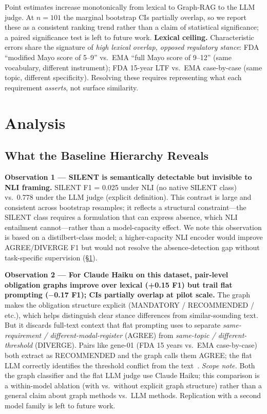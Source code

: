 \documentclass[manuscript]{acmart}
\begin{document}
Point estimates increase monotonically from lexical to Graph-RAG to the LLM
judge. At $n = 101$ the marginal bootstrap CIs partially overlap, so we report
these as a consistent ranking trend rather than a claim of statistical
significance; a paired significance test is left to future work.
\textbf{Lexical ceiling.} Characteristic errors share the signature of
\textit{high lexical overlap, opposed regulatory stance}: FDA
``modified Mayo score of 5--9'' vs.\ EMA ``full Mayo score of 9--12''
(same vocabulary, different instrument); FDA 15-year LTF vs.\ EMA
case-by-case (same topic, different specificity). Resolving these requires
representing what each requirement \textit{asserts}, not surface similarity.

\section{Analysis}
\label{sec:discussion}

\subsection{What the Baseline Hierarchy Reveals}

\textbf{Observation 1 --- SILENT is semantically detectable but invisible to
NLI framing.} SILENT F1 = 0.025 under NLI (no native SILENT class) vs.\ 0.778
under the LLM judge (explicit definition). This contrast is large and consistent
across bootstrap resamples; it reflects a structural constraint---the SILENT
class requires a formulation that can express absence, which NLI entailment
cannot---rather than a model-capacity effect. We note this observation is based
on a distilbert-class model; a higher-capacity NLI encoder would improve
AGREE/DIVERGE F1 but would not resolve the absence-detection gap without
task-specific supervision (\S\ref{sec:discussion}).

\textbf{Observation 2 --- For Claude Haiku on this dataset, pair-level
obligation graphs improve over lexical (+0.15 F1) but trail flat prompting
($-$0.17 F1); CIs partially overlap at pilot scale.} The graph makes the
obligation structure explicit (MANDATORY / RECOMMENDED / etc.), which helps
distinguish clear stance differences from similar-sounding text. But it
discards full-text context that flat prompting uses to separate
\textit{same-requirement / different-modal-register} (AGREE) from
\textit{same-topic / different-threshold} (DIVERGE). Pairs like gene-01 (FDA
15 years vs.\ EMA case-by-case) both extract as RECOMMENDED and the graph
calls them AGREE; the flat LLM correctly identifies the threshold conflict from
the text~\citep{qian2026evidenceforce}.
\textit{Scope note.} Both the graph classifier and the flat LLM judge use
Claude Haiku; this comparison is a within-model ablation (with vs.\ without
explicit graph structure) rather than a general claim about graph methods vs.\
LLM methods. Replication with a second model family is left to future work.
\end{document}
